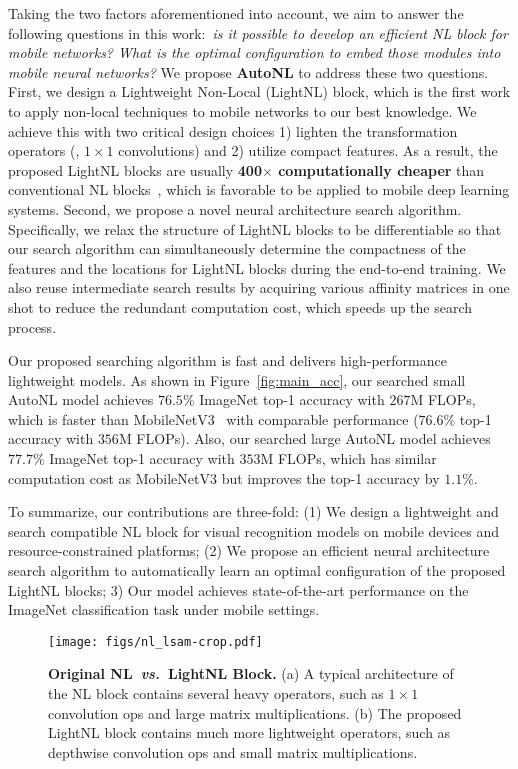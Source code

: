 \documentclass[10pt,twocolumn,letterpaper]{article}
\begin{document}
Taking the two factors aforementioned into account, we aim to answer the following questions in this work:~\emph{is it possible to develop an efficient NL block for mobile networks? What is the optimal configuration to embed those modules into mobile neural networks?} We propose \textbf{AutoNL} to address these two questions. First, we design a Lightweight Non-Local (LightNL) block, which is the first work to apply non-local techniques to mobile networks to our best knowledge. We achieve this with two critical design choices 1) lighten the transformation operators (\eg, $1\times 1$ convolutions) and 2) utilize compact features. As a result, the proposed LightNL blocks are usually \textbf{400$\times$ computationally cheaper} than conventional NL blocks~\cite{wang2018non}, which is favorable to be applied to mobile deep learning systems.
Second, we propose a novel neural architecture search algorithm. Specifically, we relax the structure of LightNL blocks to be differentiable so that our search algorithm can simultaneously determine the compactness of the features and the locations for LightNL blocks during the end-to-end training. We also reuse intermediate search results by acquiring various affinity matrices in one shot to reduce the redundant computation cost, which speeds up the search process.


Our proposed searching algorithm is fast and delivers high-performance lightweight models. As shown in Figure~\ref{fig:main_acc}, our searched small AutoNL model achieves $76.5\%$ ImageNet top-1 accuracy with $267$M FLOPs, which is faster than MobileNetV3~\cite{howard2019searching} with comparable performance ($76.6\%$ top-1 accuracy with $356$M FLOPs). Also, our searched large AutoNL model achieves $77.7\%$ ImageNet top-1 accuracy with $353$M FLOPs, which has similar computation cost as MobileNetV3 but improves the top-1 accuracy by $1.1\%$.

To summarize, our contributions are three-fold: (1) We design a lightweight and search compatible NL block for visual recognition models on mobile devices and resource-constrained platforms; (2) We propose an efficient neural architecture search algorithm to automatically learn an optimal configuration of the proposed LightNL blocks; 3) Our model achieves state-of-the-art performance on the ImageNet classification task under mobile settings.

\begin{figure*}[tb]
\centering
\texttt{[image: figs/nl\_lsam-crop.pdf]}
\caption{\textbf{Original NL~\emph{vs.}~LightNL Block.} (a) A typical architecture of the NL block contains several heavy operators, such as $1\times 1$ convolution ops and large matrix multiplications. (b) The proposed LightNL block contains much more lightweight operators, such as depthwise convolution ops and small matrix multiplications.}
\label{fig:nl_lsam}
\vspace{-1em}
\end{figure*}
\end{document}
